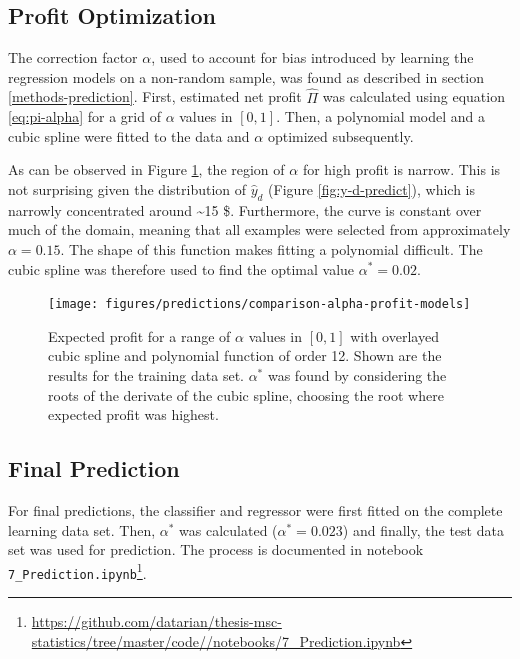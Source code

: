 \documentclass[
  11pt,
  a4paper,
  DIV=12,captions=tableheading,oneside,titlepage]{scrbook}
\begin{document}
\hypertarget{profit-optimization}{%
\subsection{Profit Optimization}\label{profit-optimization}}

The correction factor \(\alpha\), used to account for bias introduced by learning the regression models on a non-random sample, was found as described in section \ref{methods-prediction}. First, estimated net profit \(\hat{\Pi}\) was calculated using equation \eqref{eq:pi-alpha} for a grid of \(\alpha\) values in \([0,1]\). Then, a polynomial model and a cubic spline were fitted to the data and \(\alpha\) optimized subsequently.

As can be observed in Figure \ref{fig:alpha-grid}, the region of \(\alpha\) for high profit is narrow. This is not surprising given the distribution of \(\hat{y}_d\) (Figure \ref{fig:y-d-predict}), which is narrowly concentrated around \textasciitilde{}15 \$. Furthermore, the curve is constant over much of the domain, meaning that all examples were selected from approximately \(\alpha=0.15\). The shape of this function makes fitting a polynomial difficult. The cubic spline was therefore used to find the optimal value \(\alpha^*=0.02\).



\begin{figure}

{\centering \texttt{[image: figures/predictions/comparison-alpha-profit-models]} 

}

\caption{Expected profit for a range of \(\alpha\) values in \([0,1]\) with overlayed cubic spline and polynomial function of order 12. Shown are the results for the training data set. \(\alpha^*\) was found by considering the roots of the derivate of the cubic spline, choosing the root where expected profit was highest.}\label{fig:alpha-grid}
\end{figure}

\hypertarget{final-prediction}{%
\subsection{Final Prediction}\label{final-prediction}}

For final predictions, the classifier and regressor were first fitted on the complete learning data set. Then, \(\alpha^*\) was calculated (\(\alpha^* = 0.023\)) and finally, the test data set was used for prediction. The process is documented in notebook \texttt{7\_Prediction.ipynb}\footnote{\url{https://github.com/datarian/thesis-msc-statistics/tree/master/code//notebooks/7_Prediction.ipynb}}.
\end{document}
